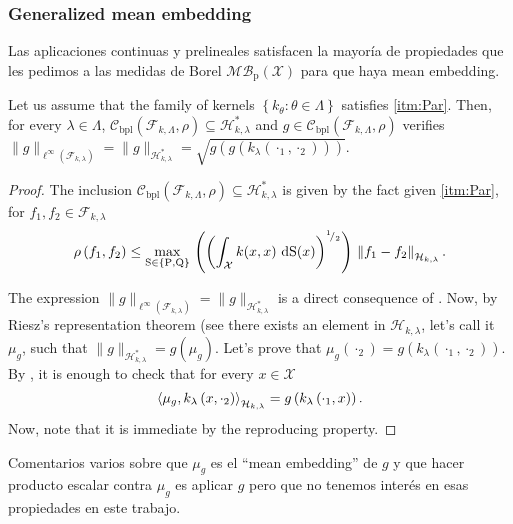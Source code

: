 		\subsubsection*{Generalized mean embedding}
			{\color{orange}Las aplicaciones continuas y prelineales satisfacen la mayor\'{i}a de propiedades que les pedimos a las medidas de Borel $\mathcal{MB}_{\operatorname{p}}(\mathcal{X})$ para que haya mean embedding.}
			\begin{Lema}
				Let us assume that the family of kernels $\left\{k_{\theta}:\theta\in\Lambda\right\}$ satisfies \ref{itm:Par}. Then, for every $\lambda\in\Lambda$, $\mathcal{C}_{\operatorname{bpl}}\left(\mathcal{F}_{k,\Lambda},\rho\right)\subseteq\mathcal{H}_{k,\lambda}^{\ast}$ and  $g\in\mathcal{C}_{\operatorname{bpl}}\left(\mathcal{F}_{k,\Lambda},\rho\right)$ verifies $\|g\|_{\ell^{\infty}\left(\mathcal{F}_{k,\lambda}\right)}=\|g\|_{\mathcal{H}_{k,\lambda}^{\ast}}=\sqrt{g\left(g\left(k_{\lambda}\left(\cdot_{1},\cdot_{2}\right)\right)\right)}$. 
			\end{Lema}
			\begin{proof}
				The inclusion $\mathcal{C}_{\operatorname{bpl}}\left(\mathcal{F}_{k,\Lambda},\rho\right)\subseteq\mathcal{H}_{k,\lambda}^{\ast}$ is given by the fact given \ref{itm:Par}, for $f_{1},f_{2}\in\mathcal{F}_{k,\lambda}$
				\begin{equation}
					\rho\left(f_{1},f_{2}\right)\leq\underset{\operatorname{S}\in\{\operatorname{P},\operatorname{Q}\}}{\operatorname{max}}\,\left(\left(\int_{\mathcal{X}}k(x,x)\,\operatorname{d}\!\operatorname{S}(x)\right)^{^{1}\!/_{2}}\right)\,\left\|f_{1}-f_{2}\right\|_{\mathcal{H}_{k,\lambda}}.
				\end{equation}
				
				The expression $\|g\|_{\ell^{\infty}\left(\mathcal{F}_{k,\lambda}\right)}=\|g\|_{\mathcal{H}_{k,\lambda}^{\ast}}$ is a direct consequence of \textcite[Lemma 2.30, p. 88]{Dudley1999}. Now, by Riesz's representation theorem (see \textcite[Th. 3.4]{Conway2019} there exists an element in $\mathcal{H}_{k,\lambda}$, let's call it $\mu_{g}$, such that $\|g\|_{\mathcal{H}_{k,\lambda}^{\ast}}=g\left(\mu_{g}\right)$. Let's prove that $\mu_{g}\left(\cdot_{2}\right)=g\left(k_{\lambda}\left(\cdot_{1},\cdot_{2}\right)\right)$. By \textcite[Th. 3]{Berlinet&Thomas-Agnan2011}, it is enough to check that for every $x\in\mathcal{X}$
				\begin{equation}
					\left\langle \mu_{g}, k_{\lambda}\left(x,\cdot_{2}\right)\right\rangle_{\mathcal{H}_{k,\lambda}}=g\left(k_{\lambda}\left(\cdot_{1},x\right)\right).
				\end{equation}
				Now, note that it is immediate by the reproducing property.
			\end{proof}
			{\color{orange}Comentarios varios sobre que $\mu_{g}$ es el \enquote{mean embedding} de $g$ y que hacer producto escalar contra $\mu_{g}$ es aplicar $g$ pero que no tenemos inter\'{e}s en esas propiedades en este trabajo.}
